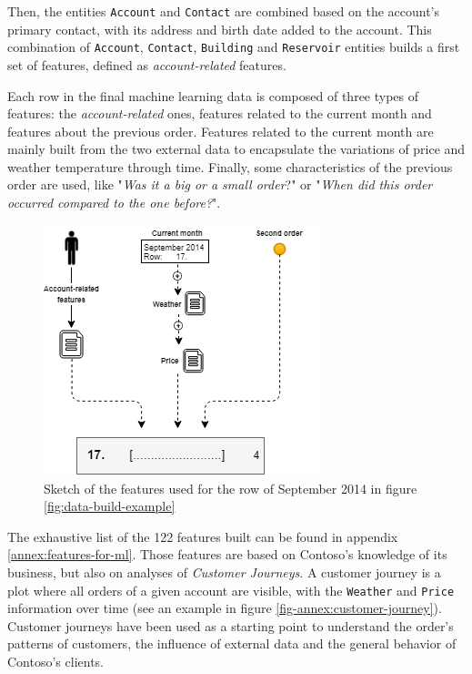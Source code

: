 Then, the entities \texttt{Account} and \texttt{Contact} are combined based on the account's primary contact, with its address and birth date added to the account. This combination of \texttt{Account}, \texttt{Contact}, \texttt{Building} and \texttt{Reservoir} entities builds a first set of features, defined as \textit{account-related} features.

Each row in the final machine learning data is composed of three types of features: the \textit{account-related} ones, features related to the current month and features about the previous order. Features related to the current month are mainly built from the two external data to encapsulate the variations of price and weather temperature through time. Finally, some characteristics of the previous order are used, like "\textit{Was it a big or a small order}?" or "\textit{When did this order occurred compared to the one before?}".


\begin{figure}[h]
    \centering
    \includegraphics[width=8cm]{images/data-build-ml-example-row.png}
\caption[Feature's combination for specific month data]{Sketch of the features used for the row of September 2014 in figure \ref{fig:data-build-example}}
    \label{fig:data-build-row-example}
\end{figure}

The exhaustive list of the 122 features built can be found in appendix \ref{annex:features-for-ml}. Those features are based on Contoso's knowledge of its business, but also on analyses of \textit{Customer Journeys}. A customer journey is a plot where all orders of a given account are visible, with the \texttt{Weather} and \texttt{Price} information over time (see an example in figure \ref{fig-annex:customer-journey}). Customer journeys have been used as a starting point to understand the order's patterns of customers, the influence of external data and the general behavior of Contoso's clients.

